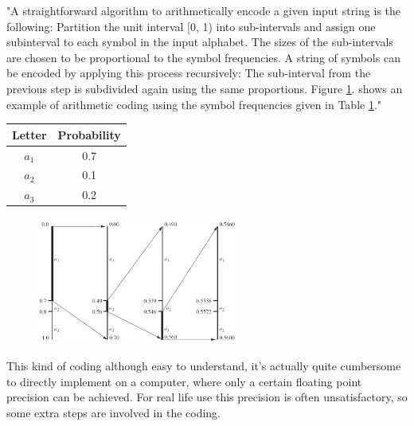       "A straightforward algorithm to arithmetically encode a given input string is the following: Partition the unit interval [0, 1) into sub-intervals and assign one subinterval to each symbol in the input alphabet. The sizes of the sub-intervals are chosen to be proportional to the symbol frequencies. A string of symbols can be encoded by applying this process recursively: The sub-interval from the previous step is subdivided again using the same proportions. Figure \ref{fig:arithmetic}. shows an example of arithmetic coding using the symbol frequencies given in Table \ref{tab:arithmetic}."

      \begin{table}
        \centering
        \begin{tabular}{cc}
          \toprule
          Letter & Probability \\
          \midrule
          $a_1$ & 0.7 \\
          $a_2$ & 0.1 \\
          $a_3$ & 0.2 \\
          \bottomrule
        \end{tabular}
        \label{tab:arithmetic}
      \end{table}

      \begin{figure}
        \centering
        \includegraphics[width=0.6\textwidth]{arithmetic}
        \label{fig:arithmetic}
      \end{figure}

      This kind of coding although easy to understand, it's actually quite cumbersome to directly implement on a computer, where only a certain floating point precision can be achieved. For real life use this precision is often unsatisfactory, so some extra steps are involved in the coding.

